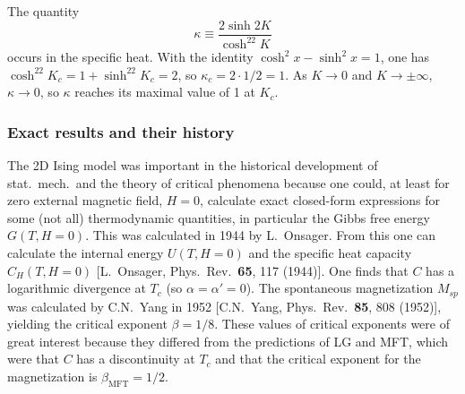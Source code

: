 The quantity
\begin{equation}
  \kappa\equiv\frac{2\sinh 2K}{\cosh^22K}
\end{equation}
occurs in the specific heat. With the identity $\cosh^2x-\sinh^2x = 1$, one has
$\cosh^22K_c = 1+\sinh^22K_c = 2$, so $\kappa_c = 2\cdot 1/2 = 1$. As $K\to 0$ and
$K\to\pm\infty$, $\kappa\to 0$, so $\kappa$ reaches its maximal value of 1 at $K_c$.

\begin{diagram}
\end{diagram}

\subsubsection*{Exact results and their history}

The 2D Ising model was important in the historical development of stat.\ mech.\ and the theory of
critical phenomena because one could, at least for zero external magnetic field, $H = 0$, calculate
exact closed-form expressions for some (not all) thermodynamic quantities, in particular the Gibbs
free energy $G(T,H=0)$. This was calculated in 1944 by L.~Onsager. From this one can calculate the
internal energy $U(T,H=0)$ and the specific heat capacity $C_H(T,H=0)$ [L.~Onsager, Phys.\ Rev.\
\textbf{65}, 117 (1944)]. One finds that $C$ has a logarithmic divergence at $T_c$ (so
$\alpha = \alpha' = 0$). The spontaneous magnetization $M_{sp}$ was calculated by C.N.~Yang in 1952
[C.N.~Yang, Phys.\ Rev.\ \textbf{85}, 808 (1952)], yielding the critical exponent $\beta = 1/8$.
These values of critical exponents were of great interest because they differed from the predictions
of LG and MFT, which were that $C$ has a discontinuity at $T_c$ and that the critical exponent for the
magnetization is $\beta_{\text{MFT}} = 1/2$.

